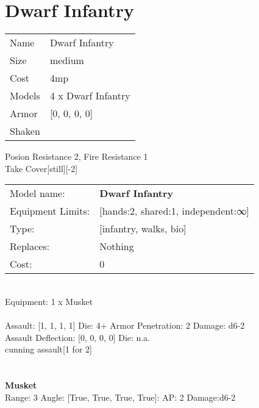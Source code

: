 \pagebreak

\section{ Dwarf Infantry }

\begin{tabular}{ll}
  Name & Dwarf Infantry \\
  Size & medium\\
  Cost & 4mp\\
  Models & 4 x Dwarf Infantry\\
  Armor & [0, 0, 0, 0]\\
  Shaken & \\
\end{tabular}

\noindent Posion Resistance 2, Fire Resistance 1\\ 
Take Cover[still][-2]\\ 


\noindent
\begin{tabular}{ll}
Model name: &{\bf Dwarf Infantry } \\
Equipment Limits: &[hands:2, shared:1, independent:∞] \\
Type: &[infantry, walks, bio] \\
Replaces: &Nothing \\
Cost: & 0\\
\end{tabular}
\ \\
Equipment: 1 x Musket \\
\ \\
Assault: [1, 1, 1, 1] Die: 4+ Armor Penetration: 2 Damage: d6-2 \\
Assault Deflection: [0, 0, 0, 0] Die: n.a.\\
\indent cunning assault[1 for 2]\\ 
 
\ \\

\ \\
{\bf Musket } \\



Range: 3  Angle: [True, True, True, True]: AP: 2 Damage:d6-2 \\




 
\ \\



